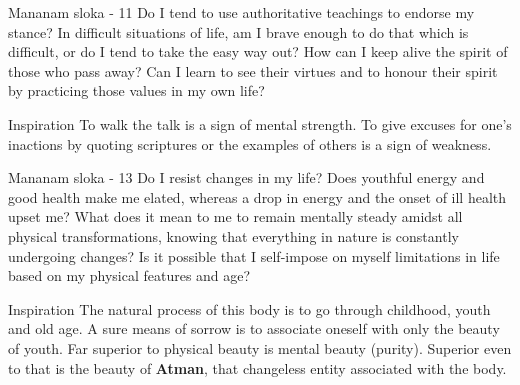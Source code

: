 \newpage
\begin{mananam}{\mananamfont Mananam sloka - 11}
\mananamtext Do I tend to use authoritative teachings to endorse my stance? In difficult situations of life, am I brave enough to do that which is difficult, or do I tend to take the easy way out?
How can I keep alive the spirit of those who pass away? Can I learn to see their virtues and to honour their spirit by practicing those values in my own life? 
\end{mananam}
\WritingHand{}
\begin{inspiration}{\mananamfont Inspiration}
\mananamtext To walk the talk is a sign of mental strength. To give excuses for one’s inactions by quoting scriptures or the examples of others is a sign of weakness.
\end{inspiration}
\newpage

\newpage
\begin{mananam}{\mananamfont Mananam sloka - 13}
\mananamtext Do I resist changes in my life? Does youthful energy and good health make me elated, whereas a drop in energy and the onset of ill health upset me? What does it mean to me to remain mentally steady amidst all physical transformations, knowing that everything in nature is constantly undergoing changes? Is it possible that I self-impose on myself limitations in life based on my physical features and age?
\end{mananam}
\WritingHand{}
\begin{inspiration}{\mananamfont Inspiration}
\mananamtext The natural process of this body is to go through childhood, youth and old age. A sure means of sorrow is to associate oneself with only the beauty of youth. Far superior to physical beauty is mental beauty (purity). Superior even to that is the beauty of \textbf{Atman}, that changeless entity associated with the body.
\end{inspiration}
\newpage

